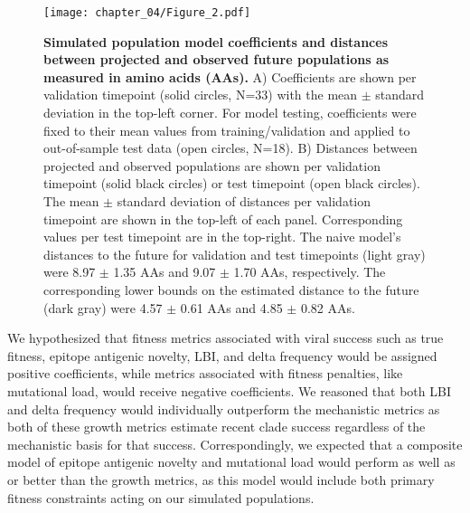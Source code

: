 \begin{figure}
  \begin{center}
  \texttt{[image: chapter\_04/Figure\_2.pdf]}
  \caption[{Simulated population model coefficients and distances between projected and observed future populations as measured in amino acids (AAs).}]{
    {\bf Simulated population model coefficients and distances between projected and observed future populations as measured in amino acids (AAs).}
    A) Coefficients are shown per validation timepoint (solid circles, N=33) with the mean $\pm$ standard deviation in the top-left corner.
    For model testing, coefficients were fixed to their mean values from training/validation and applied to out-of-sample test data (open circles, N=18).
    B) Distances between projected and observed populations are shown per validation timepoint (solid black circles) or test timepoint (open black circles).
    The mean $\pm$ standard deviation of distances per validation timepoint are shown in the top-left of each panel.
    Corresponding values per test timepoint are in the top-right.
    The naive model's distances to the future for validation and test timepoints (light gray) were 8.97 $\pm$ 1.35 AAs and 9.07 $\pm$ 1.70 AAs, respectively.
    The corresponding lower bounds on the estimated distance to the future (dark gray) were 4.57 $\pm$ 0.61 AAs and 4.85 $\pm$ 0.82 AAs.
  }
  \label{fig:unadjusted_model_accuracy_and_coefficients_for_simulated_populations_controls}
  \end{center}
\end{figure}

We hypothesized that fitness metrics associated with viral success such as true fitness, epitope antigenic novelty, LBI, and delta frequency would be assigned positive coefficients, while metrics associated with fitness penalties, like mutational load, would receive negative coefficients.
We reasoned that both LBI and delta frequency would individually outperform the mechanistic metrics as both of these growth metrics estimate recent clade success regardless of the mechanistic basis for that success.
Correspondingly, we expected that a composite model of epitope antigenic novelty and mutational load would perform as well as or better than the growth metrics, as this model would include both primary fitness constraints acting on our simulated populations.

